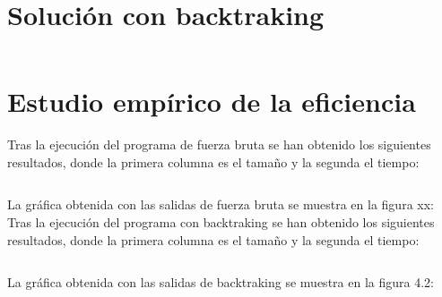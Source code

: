 	\section[Solución con backtraking]{Solución con backtraking}

	
	\lstset{language=C}
	\begin{lstlisting}[frame=single]

	\end{lstlisting} 

	\section[Estudio empírico de la eficiencia]{Estudio empírico de la eficiencia}
		
	Tras la ejecución del programa de fuerza bruta se han obtenido los siguientes resultados, donde la primera columna es el tamaño y la segunda el tiempo:\\
	
	\lstset{language=C}
	\begin{lstlisting}[frame=single]

	\end{lstlisting} 
	
	La gráfica obtenida con las salidas de fuerza bruta se muestra en la figura xx: \\
	
	
	Tras la ejecución del programa con backtraking se han obtenido los siguientes resultados, donde la primera columna es el tamaño y la segunda el tiempo: \\
	
	\lstset{language=C}
	\begin{lstlisting}[frame=single]

	\end{lstlisting} 

	La gráfica obtenida con las salidas de backtraking se muestra en la figura 4.2: \\

	


